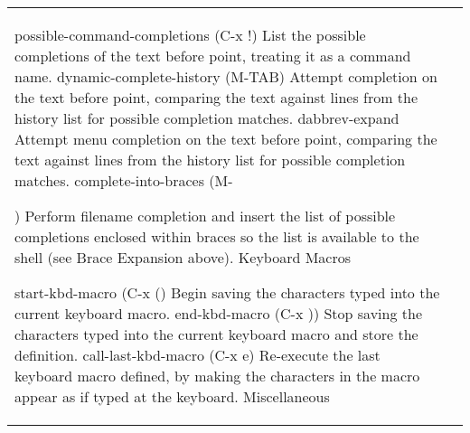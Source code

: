\documentclass[11pt]{article}
\begin{document}
\begin{longtable}{p{}p{}}
{{{possible-command-completions (C-x !)
List the possible completions of the text before point, treating it as a command name.
dynamic-complete-history (M-TAB)
Attempt completion on the text before point, comparing the text against lines from the history list for possible completion matches.
dabbrev-expand
Attempt menu completion on the text before point, comparing the text against lines from the history list for possible completion matches.
complete-into-braces (M-{)
Perform filename completion and insert the list of possible completions enclosed within braces so the list is available to the shell (see Brace Expansion above).
Keyboard Macros

start-kbd-macro (C-x ()
Begin saving the characters typed into the current keyboard macro.
end-kbd-macro (C-x ))
Stop saving the characters typed into the current keyboard macro and store the definition.
call-last-kbd-macro (C-x e)
Re-execute the last keyboard macro defined, by making the characters in the macro appear as if typed at the keyboard.
Miscellaneous

}}}}
\end{longtable}
\end{document}
